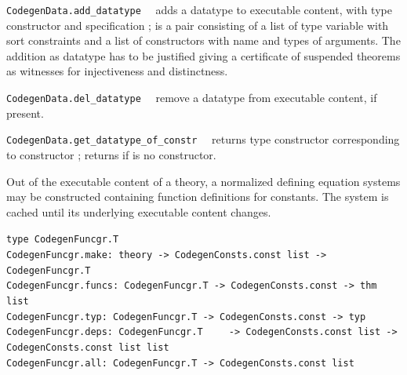 \begin{isabellebody}
\begin{isamarkuptext}
\begin{description}
  \item \verb|CodegenData.add_datatype|~~ adds
     a datatype to executable content, with type constructor
      and specification ;  is
     a pair consisting of a list of type variable with sort
     constraints and a list of constructors with name
     and types of arguments.  The addition as datatype
     has to be justified giving a certificate of suspended
     theorems as witnesses for injectiveness and distinctness.

  \item \verb|CodegenData.del_datatype|~~
     remove a datatype from executable content, if present.

  \item \verb|CodegenData.get_datatype_of_constr|~~
     returns type constructor corresponding to
     constructor ; returns 
     if  is no constructor.

  \end{description}%
\end{isamarkuptext}%
\isamarkuptrue%
%
\endisatagmlref
{\isafoldmlref}%
%
\isadelimmlref
%
\endisadelimmlref
%
\isamarkuptrue%
%
\begin{isamarkuptext}%
Out of the executable content of a theory, a normalized
  defining equation systems may be constructed containing
  function definitions for constants.  The system is cached
  until its underlying executable content changes.%
\end{isamarkuptext}%
\isamarkuptrue%
%
\isadelimmlref
%
\endisadelimmlref
%
\isatagmlref
%
\begin{isamarkuptext}%
\begin{mldecls}
  \verb|type CodegenFuncgr.T| \\
  \verb|CodegenFuncgr.make: theory -> CodegenConsts.const list -> CodegenFuncgr.T| \\
  \verb|CodegenFuncgr.funcs: CodegenFuncgr.T -> CodegenConsts.const -> thm list| \\
  \verb|CodegenFuncgr.typ: CodegenFuncgr.T -> CodegenConsts.const -> typ| \\
  \verb|CodegenFuncgr.deps: CodegenFuncgr.T|\isasep\isanewline%
\verb|    -> CodegenConsts.const list -> CodegenConsts.const list list| \\
  \verb|CodegenFuncgr.all: CodegenFuncgr.T -> CodegenConsts.const list|
  \end{mldecls}


\end{isamarkuptext}
\end{isabellebody}
